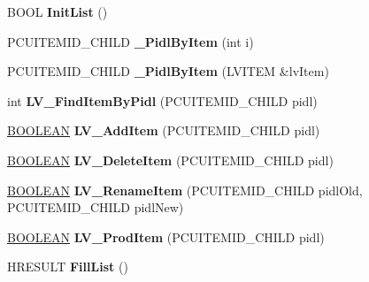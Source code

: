 \begin{DoxyCompactItemize}
B\+O\+OL {\bfseries Init\+List} ()
\item 
\mbox{\label{class_c_def_view_ab0ff6ba22bcbb7b640f4760a6ef5c645}} 
P\+C\+U\+I\+T\+E\+M\+I\+D\+\_\+\+C\+H\+I\+LD {\bfseries \+\_\+\+Pidl\+By\+Item} (int i)
\item 
\mbox{\label{class_c_def_view_a0b7de9bb7e4fadc66d5d11832efaf425}} 
P\+C\+U\+I\+T\+E\+M\+I\+D\+\_\+\+C\+H\+I\+LD {\bfseries \+\_\+\+Pidl\+By\+Item} (L\+V\+I\+T\+EM \&lv\+Item)
\item 
\mbox{\label{class_c_def_view_af8ce73d1a20682b736f250620937431f}} 
int {\bfseries L\+V\+\_\+\+Find\+Item\+By\+Pidl} (P\+C\+U\+I\+T\+E\+M\+I\+D\+\_\+\+C\+H\+I\+LD pidl)
\item 
\mbox{\label{class_c_def_view_a1b2e7879cea00dc23b7c28c093b67b2d}} 
\hyperlink{_processor_bind_8h_a112e3146cb38b6ee95e64d85842e380a}{B\+O\+O\+L\+E\+AN} {\bfseries L\+V\+\_\+\+Add\+Item} (P\+C\+U\+I\+T\+E\+M\+I\+D\+\_\+\+C\+H\+I\+LD pidl)
\item 
\mbox{\label{class_c_def_view_a3be00e5d36212778094b5e9653246217}} 
\hyperlink{_processor_bind_8h_a112e3146cb38b6ee95e64d85842e380a}{B\+O\+O\+L\+E\+AN} {\bfseries L\+V\+\_\+\+Delete\+Item} (P\+C\+U\+I\+T\+E\+M\+I\+D\+\_\+\+C\+H\+I\+LD pidl)
\item 
\mbox{\label{class_c_def_view_acc879070cfe8ccd196ffc9e34bb5b266}} 
\hyperlink{_processor_bind_8h_a112e3146cb38b6ee95e64d85842e380a}{B\+O\+O\+L\+E\+AN} {\bfseries L\+V\+\_\+\+Rename\+Item} (P\+C\+U\+I\+T\+E\+M\+I\+D\+\_\+\+C\+H\+I\+LD pidl\+Old, P\+C\+U\+I\+T\+E\+M\+I\+D\+\_\+\+C\+H\+I\+LD pidl\+New)
\item 
\mbox{\label{class_c_def_view_a7278be8b272e15707de9cdf98de61822}} 
\hyperlink{_processor_bind_8h_a112e3146cb38b6ee95e64d85842e380a}{B\+O\+O\+L\+E\+AN} {\bfseries L\+V\+\_\+\+Prod\+Item} (P\+C\+U\+I\+T\+E\+M\+I\+D\+\_\+\+C\+H\+I\+LD pidl)
\item 
\mbox{\label{class_c_def_view_affa8f4c6274dd8045ccac3d3decd2da0}} 
H\+R\+E\+S\+U\+LT {\bfseries Fill\+List} ()
\item 
\mbox{\label{class_c_def_view_a20593b036caf4cd34ad8983fd4b79e3e}} 

\end{DoxyCompactItemize}
